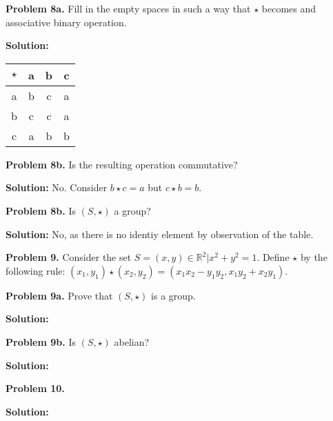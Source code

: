 \documentclass[12pt, letterpaper]{article}
\newenvironment{problem}
    [1]
    {\noindent \textbf{Problem #1.}}
    {\vspace{3mm}}
\newenvironment{solution}
    [0]
    {\noindent \textbf{Solution:}} 
    {\vspace{3mm}}
\begin{document}
    \begin{problem}{8a}
        Fill in the empty spaces in such a way that $\star$ becomes and associative binary 
        operation.
    \end{problem}

    \begin{solution}
        \begin{center}
            \begin{tabular}{ c | c c c } 
                $\star$ & a & b & c \\ 
                \hline
                a & b & c & a \\ 
                b & c & c & a \\ 
                c & a & b & b\\ 
            \end{tabular}
            \end{center}
    \end{solution}

    \begin{problem}{8b}
        Is the resulting operation commutative?
    \end{problem}

    \begin{solution}
        No. Consider $b \star c = a$ but $c \star b = b$.
    \end{solution}

    \begin{problem}{8b}
        Is $(S, \star)$ a group?
    \end{problem}

    \begin{solution}
        No, as there is no identiy element by observation of the table.
    \end{solution}

    \begin{problem}{9}
        Consider the set $S = {(x, y) \in \mathbb{R}^2 | x^2 + y^2 = 1}$. Define
        $\star$ by the following rule: $(x_1, y_1) \star (x_2, y_2) = 
        (x_1 x_2 - y_1 y_2, x_1 y_2 + x_2 y_1)$.
    \end{problem}

    \begin{problem}{9a}
        Prove that $(S, \star)$ is a group.
    \end{problem}

    \begin{solution}
    \end{solution}

    \begin{problem}{9b}
        Is $(S, \star)$ abelian?
    \end{problem}

    \begin{solution}
    \end{solution}

    \begin{problem}{10}
    \end{problem}

    \begin{solution}
    \end{solution}
    
\end{document}

